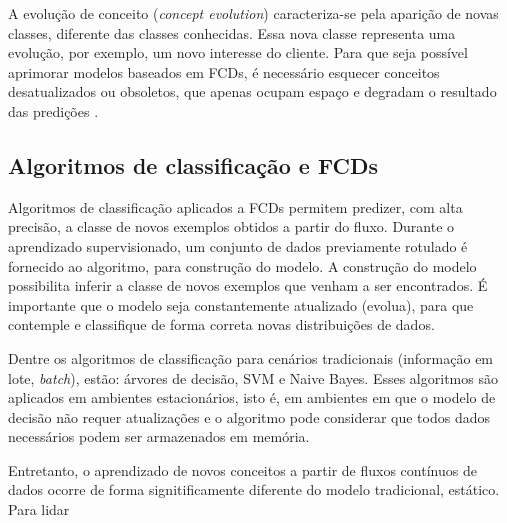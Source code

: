 \documentclass[qual, classic, a4paper]{ufbathesis}
\begin{document}
A evolução de conceito (\textit{concept evolution}) caracteriza-se pela aparição de novas classes, diferente das classes conhecidas. Essa nova classe representa uma evolução, por exemplo, um novo interesse do cliente. Para que seja possível aprimorar modelos baseados em FCDs, é necessário esquecer conceitos desatualizados ou obsoletos, que apenas ocupam espaço e degradam o resultado das predições \cite{Abdallah}.

\subsection{Algoritmos de classificação e FCDs}

Algoritmos de classificação aplicados a FCDs permitem predizer, com alta precisão, a classe de novos exemplos obtidos a partir do fluxo. 
Durante o aprendizado supervisionado, um conjunto de dados previamente rotulado é fornecido ao algoritmo, para construção do modelo. A construção do modelo possibilita inferir a classe de novos exemplos que venham a ser encontrados. É importante que o modelo seja constantemente atualizado (evolua), para que contemple e classifique de forma correta novas distribuições de dados.

Dentre os algoritmos de classificação para cenários tradicionais (informação em lote, \textit{batch}), estão: árvores de decisão, SVM e Naive Bayes. Esses algoritmos são aplicados em ambientes estacionários, isto é, em ambientes em que o modelo de decisão não requer atualizações e o algoritmo pode considerar que todos dados necessários podem ser armazenados em memória.

Entretanto, o aprendizado de novos conceitos a partir de fluxos contínuos de dados ocorre de forma signitificamente diferente do modelo tradicional, estático. Para lidar 



\end{document}
